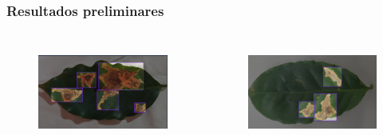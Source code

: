 \documentclass[aspectratio=169]{beamer}
\begin{document}
\begin{frame}
    \frametitle{Resultados preliminares}


    \begin{columns}



        \begin{figure}
            \centering
            \includegraphics[scale = 0.3]{img/folhaRoboflow2.png}
            \label{fig:entelabel}
        \end{figure}



        \begin{figure}
            \centering
            \includegraphics[scale = 0.3]{img/FolhRoboflow1.png}
            \label{fig:entelabel}
        \end{figure}


    \end{columns}

\end{frame}
\end{document}
